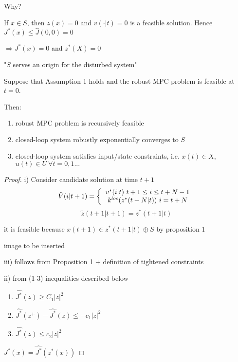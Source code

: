 Why? 

If $x \in S$, then $z(x) = 0$ and $v(\cdot|t) = 0$ is a feasible solution. Hence $J^*(x) \leq \hat{J}(0,0) = 0$

$\Rightarrow J^*(x) = 0$ and $z^*(X) = 0$

"$S$ serves an origin for the disturbed system"

\begin{Theorem}Suppose that Assumption 1 holds and the robust MPC problem is feasible at $t = 0$.

Then: 
\begin{enumerate}[label=(\roman*)]
\item robust MPC problem is recursively feasible
\item closed-loop system robustly exponentially converges to $S$
\item closed-loop system satisfies input/state constraints, i.e. $x(t) \in X$, $u(t) \in U \ \forall t = 0,1 ...$
\end{enumerate} 

\begin{proof}

i) Consider candidate solution at time $t+1$ 
\begin{equation*}
\tilde{V}(i|t+1) = \left \{
  \begin{tabular}{c}
  $v^*(i|t) \ t+1 \leq i \leq t+ N -1$ \\
  $k^{loc}(z^*(t+N|t)) \ i = t + N$
  \end{tabular}
\right .
\end{equation*}
\begin{equation*}
\tilde{z}(t+1 | t+1) = z^*(t+1|t)
\end{equation*}

it is feasible because $x(t+1) \in z^*(t+1|t) \oplus S$ by proposition 1

image to be inserted


iii) follows from Proposition 1 + definition of tightened constraints


ii) from (1-3) inequalities described below

\begin{enumerate}
\item $\hat{J^*}(z) \geq C_1|z|^2$
\item $\hat{J^*}(z^+) - \hat{J^*}(z) \leq - c_1 |z|^2$
\item $\hat{J^*}(z) \leq c_2|z|^2$
\end{enumerate}

$J^*(x) = \hat{J^*}(z^*(x))$


\end{proof}
\end{Theorem}
